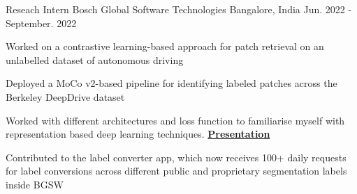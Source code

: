 

\begin{cventries}

  \cventry
    {Reseach Intern} %
    {Bosch Global Software Technologies} %
    {Bangalore, India} %
    {Jun. 2022 - September. 2022} %
    {
      \begin{cvitems} %
      \item{Worked on a contrastive learning-based approach for patch retrieval on an unlabelled dataset of autonomous driving}
      \item{Deployed a MoCo v2-based pipeline for identifying labeled patches across the Berkeley DeepDrive dataset}
      \item{Worked with different architectures and loss function to familiarise myself with representation based deep learning techniques. \href{https://docs.google.com/presentation/d/1wAB37q0hW6Y5Qfz5sY9cZwgJjKuUQsmOWMh0wMF9U88/edit?usp=sharing}{\bf Presentation}}
      \item{Contributed to the label converter app, which now receives 100+ daily requests for label conversions across different public and proprietary segmentation labels inside BGSW}
      \end{cvitems}
    }


\end{cventries}
